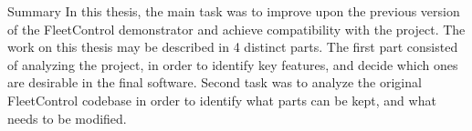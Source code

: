 \chap Summary
In this thesis, the main task was to improve upon the previous version of the FleetControl demonstrator and achieve compatibility with the {\mapfIR} project. 
The work on this thesis may be described in 4 distinct parts.\br
The first part consisted of analyzing the {\mapfIR} project, in order to identify key features, and decide which ones are desirable in the final software.
\br
Second task was to analyze the original FleetControl codebase in order to identify what parts can be kept, and what needs to be modified.
\br
 